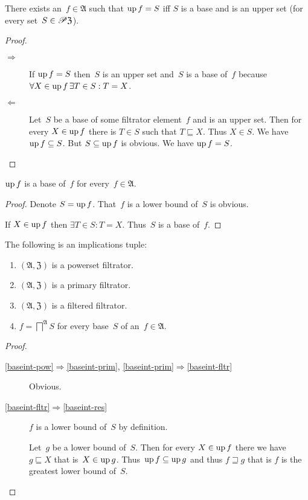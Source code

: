 \begin{prop}
There exists an~$f\in\mathfrak{A}$ such that $\operatorname{up} f=S$ iff $S$ is a base and is an upper set
(for every set~$S\in\mathscr{P}\mathfrak{Z}$).
\end{prop}

\begin{proof}
~
\begin{description}
\item[$\Rightarrow$] If $\operatorname{up} f=S$ then~$S$ is an upper set and~$S$ is a base of~$f$ because
  $\forall X\in\operatorname{up} f\,\exists T\in S:T=X$.

\item[$\Leftarrow$] Let~$S$ be a base of some filtrator element~$f$ and is an upper set.
Then for every $X\in\operatorname{up} f$ there is $T\in S$ such that $T\sqsubseteq X$.
Thus $X\in S$. We have $\operatorname{up} f\subseteq S$. But $S\subseteq\operatorname{up} f$ is obvious.
We have $\operatorname{up} f=S$.
\end{description}
\end{proof}

\begin{prop}
$\operatorname{up} f$ is a base of~$f$ for every~$f\in\mathfrak{A}$.
\end{prop}

\begin{proof}
Denote $S=\operatorname{up} f$. That~$f$ is a lower bound of~$S$ is obvious.

If $X\in\operatorname{up} f$ then $\exists T\in S:T=X$. Thus~$S$ is a base of~$f$.
\end{proof}

\begin{prop}
The following is an implications tuple:
\begin{enumerate}
\item\label{baseint-pow} $(\mathfrak{A},\mathfrak{Z})$ is a powerset filtrator.
\item\label{baseint-prim} $(\mathfrak{A},\mathfrak{Z})$ is a primary filtrator.
\item\label{baseint-fltr} $(\mathfrak{A},\mathfrak{Z})$ is a filtered filtrator.
\item\label{baseint-res} $f = \bigsqcap^{\mathfrak{A}} S$ for every base~$S$ of an~$f\in\mathfrak{A}$.
\end{enumerate}
\end{prop}

\begin{proof}
  ~
  \begin{description}
  \item[\ref{baseint-pow}$\Rightarrow$\ref{baseint-prim}, \ref{baseint-prim}$\Rightarrow$\ref{baseint-fltr}] Obvious.

  \item[\ref{baseint-fltr}$\Rightarrow$\ref{baseint-res}]
    $f$ is a lower bound of~$S$ by definition.

    Let~$g$ be a lower bound of~$S$. Then for every $X\in\operatorname{up} f$ there we have $g\sqsubseteq X$ that is~$X\in\operatorname{up} g$.
    Thus~$\operatorname{up} f\subseteq\operatorname{up} g$ and thus $f\sqsupseteq g$ that is $f$ is the greatest lower bound of~$S$.
  \end{description}
\end{proof}

